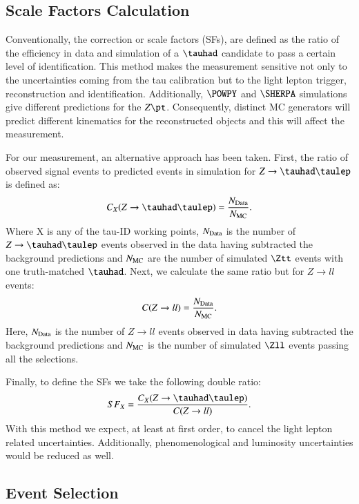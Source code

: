 \subsection{Scale Factors Calculation}\label{sec3.2}
Conventionally, the correction or scale factors (SFs), are defined as the ratio of the efficiency in data and simulation of a $\tauhad$ candidate to pass a certain level of identification. This method makes the measurement sensitive not only to the uncertainties coming from the tau calibration but to the light lepton trigger, reconstruction and identification. Additionally, $\POWPY$ and $\SHERPA$ simulations give different predictions for the $Z\pt$. Consequently, distinct MC generators will predict different kinematics for the reconstructed objects and this will affect the measurement.

For our measurement, an alternative approach has been taken. First, the ratio of observed signal events to predicted events in simulation for $Z\to\tauhad\taulep$ is defined as:
\begin{equation}
	C_{X}(Z\to\tauhad\taulep)=\frac{\NData}{\NMC}.
	\label{eq14}
\end{equation}
Where X is any of the tau-ID working points, $N_{\text{Data}}$ is the number of $Z\to\tauhad\taulep$ events observed in the data having subtracted the background predictions and $N_{\text{MC}}$ are the number of simulated $\Ztt$ events with one truth-matched $\tauhad$. Next, we calculate the same ratio but for $Z\to ll$ events:
\begin{equation}
C(Z\to ll)=\frac{N_{\text{Data}}}{N_{\text{MC}}}.
\end{equation}
Here, $N_{\text{Data}}$ is the number of $Z\to ll$ events observed in data having subtracted the background predictions and $N_{\text{MC}}$ is the number of simulated $\Zll$ events passing all the selections.

Finally, to define the SFs we take the following double ratio:
\begin{equation}
SF_{X}=\frac{C_{X}(Z\to\tauhad\taulep)}{C(Z\to ll)}.
\end{equation}
With this method we expect, at least at first order, to cancel the light lepton related uncertainties. Additionally, phenomenological and luminosity uncertainties would be reduced as well.
\subsection{Event Selection}\label{sec3.3}
